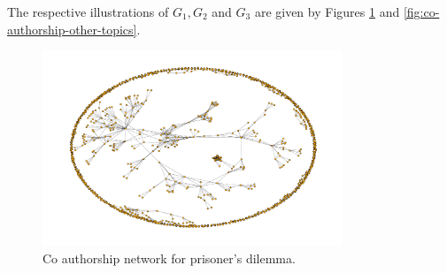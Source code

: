 \documentclass{article}
\theoremstyle{definition}
\begin{document}
The respective illustrations of \(G_1, G_2\) and \(G_3\) are given by Figures
\ref{fig:authors_network} and \ref{fig:co-authorship-other-topics}.

\begin{figure}[!hbtp]
    \centering
    \includegraphics[width=0.8\textwidth]{./assets/images/co-authors-network.pdf}
    \caption{Co authorship network for prisoner's dilemma.}\label{fig:authors_network}
\end{figure}
\end{document}
